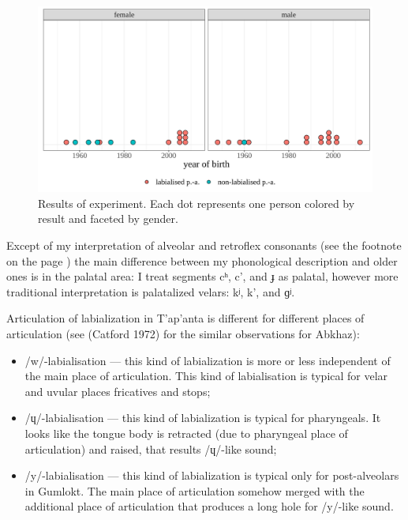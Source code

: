 \documentclass[
]{article}
\providecommand{\tightlist}{%
  \setlength{\itemsep}{0pt}\setlength{\parskip}{0pt}}
\begin{document}
\begin{figure}

{\centering \includegraphics[width=5.4in]{images/02_experiment} 

}

\caption{Results of experiment. Each dot represents one person colored by result and faceted by gender.}\label{fig:experiment-results}
\end{figure}

Except of my interpretation of alveolar and retroflex consonants (see
the footnote on the page \pageref{trans-system}) the main difference
between my phonological description and older ones is in the palatal
area: I treat segments cʰ, c', and ɟ as palatal, however more
traditional interpretation is palatalized velars: kʲ, k', and ɡʲ.

Articulation of labialization in T'ap'anta is different for different
places of articulation (see (Catford 1972) for the similar observations
for Abkhaz):

\begin{itemize}
\tightlist
\item
  /w/-labialisation --- this kind of labialization is more or less
  independent of the main place of articulation. This kind of
  labialisation is typical for velar and uvular places fricatives and
  stops;
\item
  /ɥ/-labialisation --- this kind of labialization is typical for
  pharyngeals. It looks like the tongue body is retracted (due to
  pharyngeal place of articulation) and raised, that results /ɥ/-like
  sound;
\item
  /y/-labialisation --- this kind of labialization is typical only for
  post-alveolars in Gumlokt. The main place of articulation somehow
  merged with the additional place of articulation that produces a long
  hole for /y/-like sound.
\end{itemize}
\end{document}
